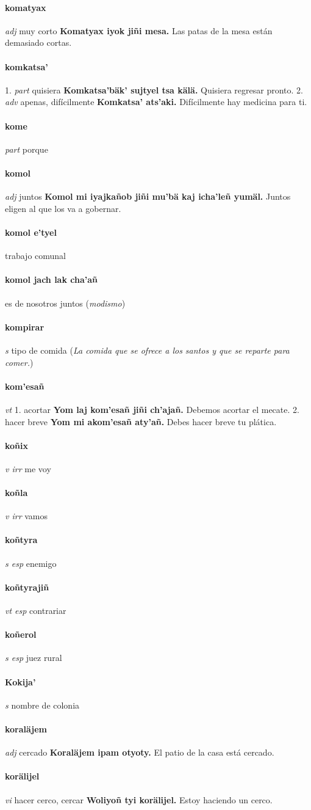\documentclass{scrbook}
\newcommand{\entry}[1]{\paragraph{#1}}
\newcommand{\onedefinition}[1]{#1.}
\newcommand{\partofspeech}[1]{\textit{#1}}
\newcommand{\spanishtranslation}[1]{#1}
\newcommand{\clarification}[1]{(\textit{#1})}
\newcommand{\cholexample}[1]{\textbf{#1}}
\newcommand{\exampletranslation}[1]{#1}
\begin{document}
\begin{multicols}{2}
\entry{komatyax}
\partofspeech{adj}
\spanishtranslation{muy corto}
\cholexample{Komatyax iyok jiñi mesa.}
\exampletranslation{Las patas de la mesa están demasiado cortas.}

\entry{komkatsa'}
\onedefinition{1}
\partofspeech{part}
\spanishtranslation{quisiera}
\cholexample{Komkatsa'bäk' sujtyel tsa kälä.}
\exampletranslation{Quisiera regresar pronto.}
\onedefinition{2}
\partofspeech{adv}
\spanishtranslation{apenas, difícilmente}
\cholexample{Komkatsa' ats'aki.}
\exampletranslation{Difícilmente hay medicina para ti.}

\entry{kome}
\partofspeech{part}
\spanishtranslation{porque}

\entry{komol}
\partofspeech{adj}
\spanishtranslation{juntos}
\cholexample{Komol mi iyajkañob jiñi mu'bä kaj icha'leñ yumäl.}
\exampletranslation{Juntos eligen al que los va a gobernar.}

\entry{komol e'tyel}
\spanishtranslation{trabajo comunal}

\entry{komol jach lak cha'añ}
\spanishtranslation{es de nosotros juntos}
\clarification{modismo}

\entry{kompirar}
\partofspeech{s}
\spanishtranslation{tipo de comida}
\clarification{La comida que se ofrece a los santos y que se reparte para comer.}

\entry{kom'esañ}
\partofspeech{vt}
\onedefinition{1}
\spanishtranslation{acortar}
\cholexample{Yom laj kom'esañ jiñi ch'ajañ.}
\exampletranslation{Debemos acortar el mecate.}
\onedefinition{2}
\spanishtranslation{hacer breve}
\cholexample{Yom mi akom'esañ aty'añ.}
\exampletranslation{Debes hacer breve tu plática.}

\entry{koñix}
\partofspeech{v irr}
\spanishtranslation{me voy}

\entry{koñla}
\partofspeech{v irr}
\spanishtranslation{vamos}

\entry{koñtyra}
\partofspeech{s esp}
\spanishtranslation{enemigo}

\entry{koñtyrajiñ}
\partofspeech{vt esp}
\spanishtranslation{contrariar}

\entry{koñerol}
\partofspeech{s esp}
\spanishtranslation{juez rural}

\entry{Kokija'}
\partofspeech{s}
\spanishtranslation{nombre de colonia}

\entry{koraläjem}
\partofspeech{adj}
\spanishtranslation{cercado}
\cholexample{Koraläjem ipam otyoty.}
\exampletranslation{El patio de la casa está cercado.}

\entry{korälijel}
\partofspeech{vi}
\spanishtranslation{hacer cerco, cercar}
\cholexample{Woliyoñ tyi korälijel.}
\exampletranslation{Estoy haciendo un cerco.}


\end{multicols}
\end{document}
